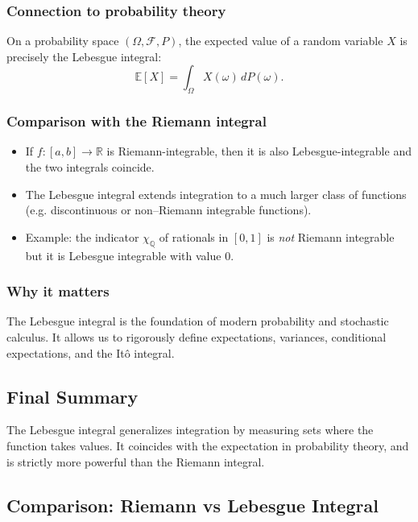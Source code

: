 \documentclass[12pt,a4paper]{book}
\theoremstyle{remark}
\begin{document}
\subsubsection*{Connection to probability theory}
On a probability space $(\Omega,\mathcal{F},P)$, the expected value of a random variable $X$ is precisely
the Lebesgue integral:
\[
\mathbb{E}[X] = \int_\Omega X(\omega)\,dP(\omega).
\]

\subsubsection*{Comparison with the Riemann integral}
\begin{itemize}
    \item If $f:[a,b]\to\mathbb{R}$ is Riemann-integrable, then it is also Lebesgue-integrable and the two integrals coincide.
    \item The Lebesgue integral extends integration to a much larger class of functions (e.g. discontinuous or non–Riemann integrable functions).
    \item Example: the indicator $\chi_\mathbb{Q}$ of rationals in $[0,1]$ is \emph{not} Riemann integrable but it is Lebesgue integrable with value $0$.
\end{itemize}

\subsubsection*{Why it matters}
The Lebesgue integral is the foundation of modern probability and stochastic calculus.  
It allows us to rigorously define expectations, variances, conditional expectations, and the Itô integral.

\subsection*{Final Summary}

The Lebesgue integral generalizes integration by measuring sets where the function takes values.
It coincides with the expectation in probability theory, and is strictly more powerful than the Riemann integral.

\subsection*{Comparison: Riemann vs Lebesgue Integral}
\end{document}
